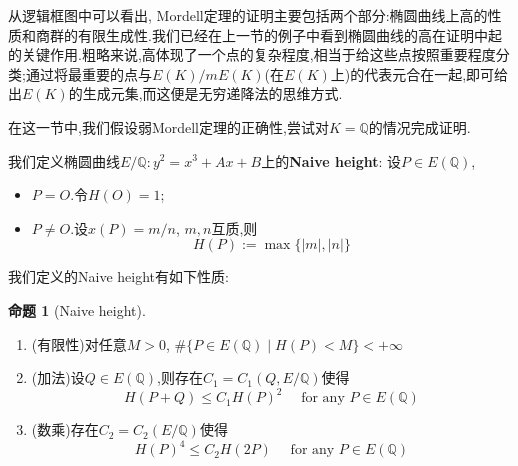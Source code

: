 \documentclass[12pt,A4paper,oneside,reqno]{amsart}
\numberwithin{equation}{section}
\theoremstyle{definition}
\newtheorem{proposition}[theorem]{命题}
\theoremstyle{plain}
\theoremstyle{plain}
\numberwithin{equation}{section}
\theoremstyle{remark}
\begin{document}
从逻辑框图中可以看出, Mordell定理的证明主要包括两个部分:椭圆曲线上高的性质和商群的有限生成性.我们已经在上一节的例子中看到椭圆曲线的高在证明中起的关键作用.粗略来说,高体现了一个点的复杂程度,相当于给这些点按照重要程度分类;通过将最重要的点与$E(K)/mE(K)$(在$E(K)$上)的代表元合在一起,即可给出$E(K)$的生成元集,而这便是无穷递降法的思维方式.

在这一节中,我们假设弱Mordell定理的正确性,尝试对$K=\mathbb{Q}$的情况完成证明.

我们定义椭圆曲线$E/\mathbb{Q}:y^2=x^3+Ax+B$上的\textbf{Naive height}:
设$P \in E(\mathbb{Q})$,
\begin{itemize}
	\item $P=O$.令$H(O)=1$;
	\item $P \neq O$.设$x(P)=m/n$, $m,n$互质,则
	$$H(P):=\max \{|m|,|n|\}$$
\end{itemize}
我们定义的Naive height有如下性质:
\begin{proposition}[Naive height]\label{prop:naiveht}\
	\begin{enumerate}[1.]
		\item (有限性)对任意$M>0$, $\#\{P \in E(\mathbb{Q})\mid H(P)<M \} < + \infty$
		\item (加法)设$Q \in E(\mathbb{Q})$,则存在$C_1=C_1(Q,E/\mathbb{Q})$使得
		$$H(P+Q) \leqslant C_1H(P)^2 \quad\text{ for any }P \in E(\mathbb{Q})$$
		\item (数乘)存在$C_2=C_2(E/\mathbb{Q})$使得
		$$H(P)^4 \leqslant C_2H(2P) \quad\text{ for any }P \in E(\mathbb{Q})$$
	\end{enumerate}
\end{proposition}
\end{document}
